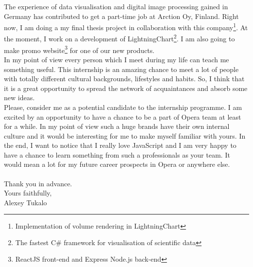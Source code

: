 \documentclass[english]{article}
\begin{document}
The experience of data visualisation and digital image processing gained in Germany has contributed to get a part-time job at Arction Oy, Finland. Right now, I am doing a my final thesis project in collaboration with this company\footnote{Implementation of volume rendering in LightningChart}. At the moment, I work on a development of LightningChart\footnote{The fastest C\# framework for visualisation of scientific data}. I am also going to make promo website\footnote{ReactJS front-end and Express Node.js back-end} for one of our new products.\\

In my point of view every person which I meet during my life can teach me something useful. This internship is an amazing chance to meet a lot of people with totally different cultural backgrounds, lifestyles and habits. So, I think that it is a great opportunity to spread the network of acquaintances and absorb some new ideas.\\

Please, consider me as a potential candidate to the internship programme. I am excited by an opportunity to have a chance to be a part of Opera team at least for a while. In my point of view such a huge brands have their own internal culture and it would be interesting for me to make myself familiar with yours. In the end, I want to notice that I really love JavaScript and I am very happy to have a chance to learn something from such a professionals as your team. It would mean a lot for my future career prospects in Opera or anywhere else. \\\\


Thank you in advance.\\
Yours faithfully,\\
Alexey Tukalo
    
\end{document}
